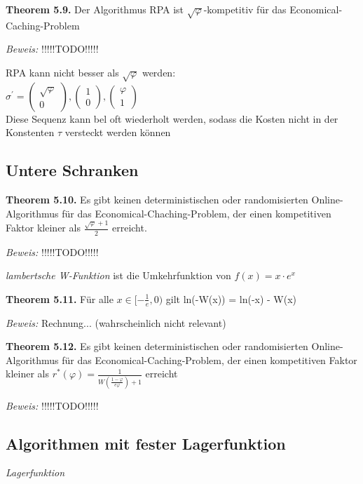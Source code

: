 \textbf{Theorem 5.9.} Der Algorithmus RPA ist $\sqrt{\varphi}$-kompetitiv für das Economical-Caching-Problem

\textit{Beweis:} !!!!!TODO!!!!!

RPA kann nicht besser als $\sqrt{\varphi}$ werden: \\
$\sigma^{'} = \left(\begin{array}{c} \sqrt{\varphi} \\ 0 \end{array}\right), \left(\begin{array}{c} 1 \\ 0 \end{array}\right), \left(\begin{array}{c} \varphi \\ 1 \end{array}\right)$ \\
Diese Sequenz kann bel oft wiederholt werden, sodass die Kosten nicht in der Konstenten $\tau$ versteckt werden können

\subsection{Untere Schranken}

\textbf{Theorem 5.10.} Es gibt keinen deterministischen oder randomisierten Online-Algorithmus für das Economical-Chaching-Problem, der einen kompetitiven Faktor kleiner als $\tfrac{\sqrt{\varphi} +1}{2}$ erreicht.

\textit{Beweis:} !!!!!TODO!!!!!

\textit{lambertsche W-Funktion} ist die Umkehrfunktion von $f(x) = x \cdot e^{x}$

\textbf{Theorem 5.11.} Für alle $x \in [-\tfrac{1}{e}, 0)$ gilt ln(-W(x)) = ln(-x) - W(x)

\textit{Beweis:} Rechnung... (wahrscheinlich nicht relevant)

\textbf{Theorem 5.12.} Es gibt keinen deterministischen oder randomisierten Online-Algorithmus für das Economical-Caching-Problem, der einen kompetitiven Faktor kleiner als $r^{*}(\varphi) = \tfrac{1}{W(\tfrac{1-\varphi}{e\varphi})+1}$ erreicht

\textit{Beweis:} !!!!!TODO!!!!!

\subsection{Algorithmen mit fester Lagerfunktion}

\textit{Lagerfunktion} 

